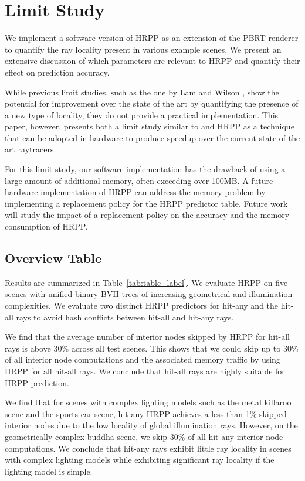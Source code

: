 \section{Limit Study} \label{sec:hrpp_res}

We implement a software version of HRPP as an extension of the PBRT renderer to quantify the ray locality present in various example scenes. We present an extensive discussion of which parameters are relevant to HRPP and quantify their effect on prediction accuracy. 
 
While previous limit studies, such as the one by Lam and Wilson \cite{Lam:1992:LCF:139669.139702}, show the potential for improvement over the state of the art by quantifying the presence of a new type of locality, they do not provide a practical implementation. This paper, however, presents both a limit study similar to \cite{Lam:1992:LCF:139669.139702} and HRPP as a technique that can be adopted in hardware to produce speedup over the current state of the art raytracers.

For this limit study, our software implementation has the drawback of using a large amount of additional memory, often exceeding over 100MB. A future hardware implementation of HRPP can address the memory problem by implementing a replacement policy for the HRPP predictor table. Future work will study the impact of a replacement policy on the accuracy and the memory consumption of HRPP.

 
\subsection{Overview Table}
Results are summarized in Table~\ref{tab:table_label}. We evaluate HRPP on five scenes with unified binary BVH trees of increasing geometrical and illumination complexities. We evaluate two distinct HRPP predictors for hit-any and the hit-all rays to avoid hash conflicts between hit-all and hit-any rays. 

We find that the average number of interior nodes skipped by HRPP for hit-all rays is above 30\% across all test scenes. This shows that we could skip up to 30\% of all interior node computations and the associated memory traffic by using HRPP for all hit-all rays. We conclude that hit-all rays are highly suitable for HRPP prediction. 

We find that for scenes with complex lighting models such as the metal killaroo scene and the sports car scene, hit-any HRPP achieves a less than 1\% skipped interior nodes due to the low locality of global illumination rays. However, on the geometrically complex buddha scene, we skip 30\% of all hit-any interior node computations. We conclude that hit-any rays exhibit little ray locality in scenes with complex lighting models while exhibiting significant ray locality if the lighting model is simple.

